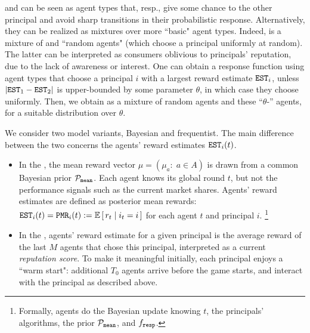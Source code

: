 \HardMaxRandom and \SoftMaxRandom can be seen as agent types that, resp., give some chance to the other principal and avoid sharp transitions in their probabilistic response. Alternatively, they can be realized as mixtures over more ``basic" agent types. Indeed, \HardMaxRandom is a mixture of \HardMax and ``random agents" (which choose a principal uniformly at random). The latter can be interpreted as consumers oblivious to principals' reputation, due to the lack of awareness or interest. One can obtain a \SoftMaxRandom response function using agent types that choose a principal $i$ with a largest reward estimate $\mathtt{EST}_i$, unless $|\mathtt{EST}_1-\mathtt{EST}_2|$ is upper-bounded by some parameter $\theta$, in which case they choose uniformly. Then, we obtain \SoftMaxRandom as a mixture of random agents and these ``$\theta$-\HardMax'' agents, for a suitable distribution over $\theta$.




We consider two model variants, Bayesian and frequentist. The main difference between the two concerns the agents' reward estimates $\mathtt{EST}_i(t)$.

\begin{itemize}
\item In the \emph{\TheoryModel}, the mean reward vector $\mu = (\mu_a:\; a\in A)$ is drawn from a common Bayesian prior $\mathcal{P}_\mathtt{mean}$. Each agent knows its global round $t$, but not the performance signals such as the current market shares. Agents' reward estimates are defined as posterior mean rewards:
        $\est_i(t) = \PMR_i(t) := \E\sbr{ r_t\mid i_t = i}$
    for each agent $t$ and principal $i$.%
\footnote{Formally, agents do the Bayesian update knowing $t$, the principals' algorithms, the prior $\mathcal{P}_\mathtt{mean}$, and $f_{\mathtt{resp}}$.}


\item In the \emph{\ExptsModel}, agents' reward estimate for a given principal is the average reward of the last $M$ agents that chose this principal, interpreted as a current \emph{reputation score}. To make it meaningful initially, each principal enjoys a ``warm start": additional $T_0$ agents arrive before the game starts, and interact with the principal as described above.

\end{itemize}

